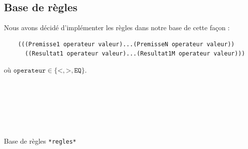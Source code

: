 \documentclass[a4paper,12pt]{article}
\begin{document}
\subsection{Base de règles}
Nous avons décidé d'implémenter les règles dans notre base de cette façon :

\begin{verbatim}
	(((Premisse1 operateur valeur)...(PremisseN operateur valeur))
  	  ((Resultat1 operateur valeur)...(Resultat1M operateur valeur)))
\end{verbatim}
où $\texttt{operateur} \in \{\texttt{<},\texttt{>},\texttt{EQ}\} $.
\begin{listing}[H]
	\centering
	\inputminted[breaklines=true,linenos,lastline=43]{lisp}{../regles.lisp}
\end{listing}

\begin{listing}[H]
	\centering
	\inputminted[breaklines=true,linenos,firstline=44,lastline=88]{lisp}{../regles.lisp}
\end{listing}

\begin{listing}[H]
	\centering
	\inputminted[breaklines=true,linenos,firstline=89,lastline=126]{lisp}{../regles.lisp}
\end{listing}

\begin{listing}[H]
	\centering
	\inputminted[breaklines=true,linenos,firstline=127,lastline=171]{lisp}{../regles.lisp}
\end{listing}

\begin{listing}[H]
	\centering
	\inputminted[breaklines=true,linenos,firstline=172,lastline=211]{lisp}{../regles.lisp}
\end{listing}

\begin{listing}[H]
	\centering
	\inputminted[breaklines=true,linenos,firstline=212,lastline=254]{lisp}{../regles.lisp}
\end{listing}

\begin{listing}[H]
	\centering
	\inputminted[breaklines=true,linenos,firstline=255,lastline=294]{lisp}{../regles.lisp}
\end{listing}


\begin{listing}[H]
	\centering
	\inputminted[breaklines=true,linenos,firstline=295]{lisp}{../regles.lisp}
	\caption{Base de règles \texttt{*regles*}}
\end{listing}
\end{document}
